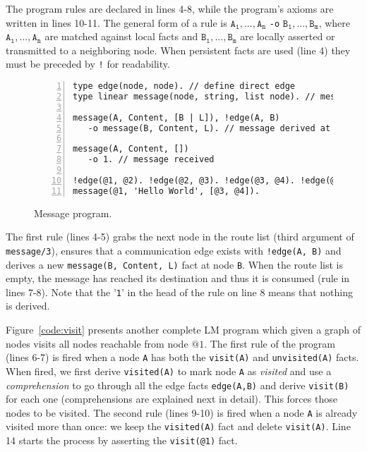 The program rules are declared in lines 4-8, while the program's axioms are written in lines 10-11.
The general form of a rule is $\mathtt{A_1},...,\mathtt{A_n}$ \texttt{-o} $\mathtt{B_1},...,\mathtt{B_m}$, where $\mathtt{A_1},...,\mathtt{A_n}$ are matched against local facts and $\mathtt{B_1},...,\mathtt{B_m}$ are locally asserted or transmitted to a neighboring node.
When persistent facts are used (line 4) they must be
preceded by \texttt{!} for readability.

\begin{figure}[h!]
\scriptsize\begin{Verbatim}[numbers=left]
type edge(node, node). // define direct edge
type linear message(node, string, list node). // message format

message(A, Content, [B | L]), !edge(A, B)
   -o message(B, Content, L). // message derived at node B

message(A, Content, [])
   -o 1. // message received

!edge(@1, @2). !edge(@2, @3). !edge(@3, @4). !edge(@1, @3).
message(@1, 'Hello World', [@3, @4]).
\end{Verbatim}
\caption{Message program.}
  \label{code:message}
\end{figure}
\normalsize

The first rule (lines 4-5) grabs the next node in the route list (third argument of \texttt{message/3}),
ensures that a communication edge exists with \texttt{!edge(A, B)} and
derives a new \texttt{message(B,~Content,~L)} fact at node \texttt{B}.
When the route list is empty, the message has reached its destination and thus it is consumed
(rule in lines 7-8). Note that the '\texttt{1}' in the head of the rule on line 8 means that nothing is derived.

Figure~\ref{code:visit} presents another complete LM program which given a graph
of nodes visits all nodes reachable from node $@1$.
The first rule of the program (lines 6-7) is fired when a node \texttt{A} has both the \texttt{visit(A)} and \texttt{unvisited(A)} facts.
When fired, we first derive \texttt{visited(A)} to mark node \texttt{A} as \textit{visited} and use a
\emph{comprehension} to go through all the edge facts \texttt{edge(A,B)} and derive \texttt{visit(B)} for each
one (comprehensions are explained next in detail). This forces those nodes to be visited.
The second rule (lines 9-10) is fired when a
node \texttt{A} is already visited more than once: we keep the \texttt{visited(A)} fact and delete \texttt{visit(A)}.
Line 14 starts the process by asserting the \texttt{visit(@1)} fact.


